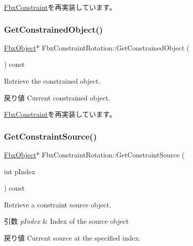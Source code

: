 \hyperlink{class_fbx_constraint_a0470a25b813b337d07a03ce4b97b44f8}{Fbx\+Constraint}を再実装しています。

\mbox{\label{class_fbx_constraint_rotation_ad9bdaf083716c730fdd907a9387e4991}} 
\subsubsection{\texorpdfstring{Get\+Constrained\+Object()}{GetConstrainedObject()}}
{\footnotesize\ttfamily \hyperlink{class_fbx_object}{Fbx\+Object}$\ast$ Fbx\+Constraint\+Rotation\+::\+Get\+Constrained\+Object (\begin{DoxyParamCaption}{ }\end{DoxyParamCaption}) const\hspace{0.3cm}{\ttfamily [virtual]}}

Retrieve the constrained object. \begin{DoxyReturn}{戻り値}
Current constrained object. 
\end{DoxyReturn}


\hyperlink{class_fbx_constraint_a7f587d5db9685b5ee925a85354263edc}{Fbx\+Constraint}を再実装しています。

\mbox{\label{class_fbx_constraint_rotation_a4bfb008520cb5aa6996104c292e5819e}} 
\subsubsection{\texorpdfstring{Get\+Constraint\+Source()}{GetConstraintSource()}}
{\footnotesize\ttfamily \hyperlink{class_fbx_object}{Fbx\+Object}$\ast$ Fbx\+Constraint\+Rotation\+::\+Get\+Constraint\+Source (\begin{DoxyParamCaption}\item[{int}]{p\+Index }\end{DoxyParamCaption}) const\hspace{0.3cm}{\ttfamily [virtual]}}

Retrieve a constraint source object. 
\begin{DoxyParams}{引数}
{\em p\+Index} & Index of the source object \\
\hline
\end{DoxyParams}
\begin{DoxyReturn}{戻り値}
Current source at the specified index. 
\end{DoxyReturn}


